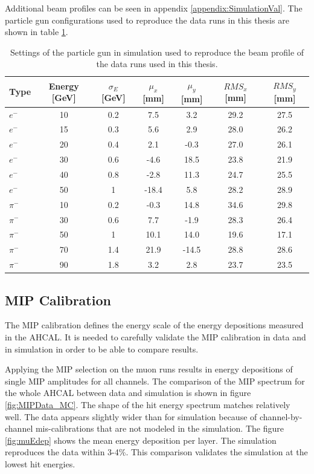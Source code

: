 Additional beam profiles can be seen in appendix \ref{appendix:SimulationVal}. The particle gun configurations used to reproduce the data runs in this thesis are shown in table \ref{table:ParticleGun}.

\begin{table}[htb!]
	\centering
	\caption{Settings of the particle gun in simulation used to reproduce the beam profile of the data runs used in this thesis.}
	\label{table:ParticleGun}
	\begin{tabular}{@{} lcccccc @{}}
		\toprule
		Type & Energy [GeV] & $\sigma_{E}$ [GeV] & $\mu_{x}$ [mm] & $\mu_{y}$ [mm] & $RMS_{x}$ [mm] & $RMS_{y}$ [mm] \\
		\midrule
		$e^-$ & 10 & 0.2 & 7.5 & 3.2 & 29.2 & 27.5\\
		$e^-$ & 15 & 0.3 & 5.6 & 2.9 & 28.0 & 26.2\\
		$e^-$ & 20 & 0.4 & 2.1 & -0.3 & 27.0 & 26.1\\
		$e^-$ & 30 & 0.6 & -4.6 & 18.5 & 23.8 & 21.9\\
		$e^-$ & 40 & 0.8 & -2.8 & 11.3 & 24.7 & 25.5\\
		$e^-$ & 50 & 1 & -18.4 & 5.8 & 28.2 & 28.9\\
		\midrule
		$\pi^-$ & 10 & 0.2 & -0.3 & 14.8 & 34.6 & 29.8\\
		$\pi^-$ & 30 & 0.6 & 7.7 & -1.9 & 28.3 & 26.4\\
		$\pi^-$ & 50 & 1 & 10.1 & 14.0 & 19.6 & 17.1\\
		$\pi^-$ & 70 & 1.4 & 21.9 & -14.5 & 28.8 & 28.6\\
		$\pi^-$ & 90 & 1.8 & 3.2 & 2.8 & 23.7 & 23.5\\
		\bottomrule
	\end{tabular}
\end{table}

\subsection{MIP Calibration}

The MIP calibration defines the energy scale of the energy depositions measured in the AHCAL. It is needed to carefully validate the MIP calibration in data and in simulation in order to be able to compare results.

Applying the MIP selection on the muon runs results in energy depositions of single MIP amplitudes for all channels. The comparison of the MIP spectrum for the whole AHCAL between data and simulation is shown in figure \ref{fig:MIPData_MC}. The shape of the hit energy spectrum matches relatively well. The data appears slightly wider than for simulation because of channel-by-channel mis-calibrations that are not modeled in the simulation. The figure \ref{fig:muEdep} shows the mean energy deposition per layer. The simulation reproduces the data within 3-4\%. This comparison validates the simulation at the lowest hit energies.

